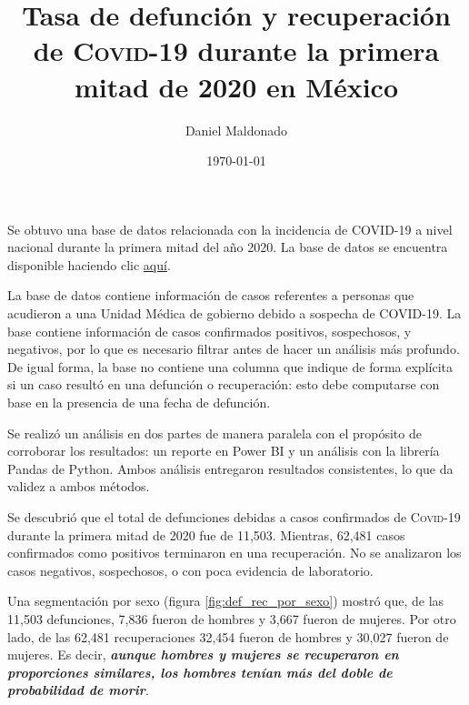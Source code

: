 \documentclass[a4paper,12pt]{article}
\title{Tasa de defunción y recuperación de {\scshape Covid-19} durante la primera mitad de 2020 en México}
\author{Daniel Maldonado}
\date{\today}
\begin{document}
{\bfseries \maketitle}

Se obtuvo una base de datos relacionada con la incidencia de COVID-19 a nivel nacional durante la primera mitad del año 2020.
La base de datos se encuentra disponible haciendo clic \href{https://datos.cdmx.gob.mx/dataset/casos-asociados-a-covid-19/resource/1943a45c-542b-4ac2-a319-cd8da9ba36f1}{aquí}.

La base de datos contiene información de casos referentes a personas que acudieron a una Unidad Médica de gobierno debido a sospecha de COVID-19.
La base contiene información de casos confirmados positivos, sospechosos, y negativos, por lo que es necesario filtrar antes de hacer un análisis más profundo.
De igual forma, la base no contiene una columna que indique de forma explícita si un caso resultó en una defunción o recuperación: esto debe computarse con base en la presencia de una fecha de defunción.

Se realizó un análisis en dos partes de manera paralela con el propósito de corroborar los resultados: un reporte en Power BI y un análisis con la librería Pandas de Python.
Ambos análisis entregaron resultados consistentes, lo que da validez a ambos métodos.

Se descubrió que el total de defunciones debidas a casos confirmados de {\scshape Covid-19} durante la primera mitad de 2020 fue de 11,503.
Mientras, 62,481 casos confirmados como positivos terminaron en una recuperación.
No se analizaron los casos negativos, sospechosos, o con poca evidencia de laboratorio.

Una segmentación por sexo (figura \ref{fig:def_rec_por_sexo}) mostró que, de las 11,503 defunciones, 7,836 fueron de hombres y 3,667 fueron de mujeres.
Por otro lado, de las 62,481 recuperaciones 32,454 fueron de hombres y 30,027 fueron de mujeres.
Es decir, {\slshape {\bfseries aunque hombres y mujeres se recuperaron en proporciones similares, los hombres tenían más del doble de probabilidad de morir}}.
\end{document}
